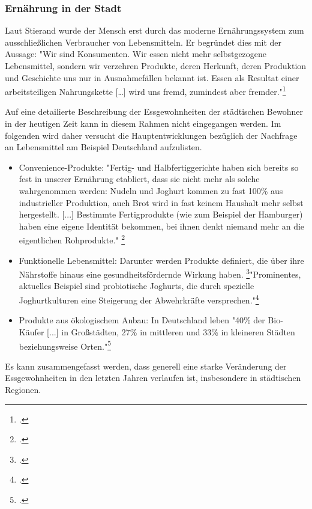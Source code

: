 \documentclass{scrartcl}
\begin{document}
\subsubsection {Ernährung in der Stadt}
  
Laut Stierand wurde der Mensch erst durch das moderne Ernährungssystem zum ausschließlichen Verbraucher von Lebensmitteln. Er begründet dies mit der Aussage: "Wir sind Konsumenten. Wir essen nicht mehr selbstgezogene Lebensmittel, sondern wir verzehren Produkte, deren Herkunft, deren Produktion und Geschichte uns nur in Ausnahmefällen bekannt ist. Essen als Resultat einer arbeitsteiligen Nahrungskette […] wird uns fremd, zumindest aber fremder."\footcite{Spiekermann2000GesundeKulturwissenschaft} 

 Auf eine detailierte Beschreibung der Essgewohnheiten der städtischen Bewohner in der heutigen Zeit kann in diesem Rahmen nicht eingegangen werden. Im folgenden wird daher versucht die Hauptentwicklungen bezüglich der Nachfrage an Lebensmittel am Beispiel Deutschland aufzulisten. 
 
 \begin{itemize}
\item Convenience-Produkte: "Fertig- und Halbfertiggerichte haben sich bereits so fest in unserer Ernährung etabliert, dass sie nicht mehr als solche wahrgenommen werden: Nudeln und Joghurt kommen zu fast 100\% aus industrieller Produktion, auch Brot wird in fast keinem Haushalt mehr selbst hergestellt. [...] Bestimmte Fertigprodukte (wie zum Beispiel der Hamburger)
haben eine eigene Identität bekommen, bei ihnen denkt niemand mehr an die eigentlichen Rohprodukte." \footcite{Escher2003EssenKultur}
\item Funktionelle Lebensmittel: Darunter werden Produkte definiert, die über ihre Nährstoffe hinaus eine gesundheitsfördernde Wirkung haben. \footcites[vgl.][S.5]{Heasman1958-2001TheProfits}"Prominentes, aktuelles Beispiel sind probiotische Joghurts, die durch spezielle Joghurtkulturen eine Steigerung der Abwehrkräfte versprechen."\footcite[S.14]{Stierand2008StadtLebensmittel}
\item Produkte aus ökologischem Anbau: In Deutschland leben "40\% der Bio-Käufer [...] in Großstädten, 27\% in mittleren und 33\% in kleineren Städten beziehungsweise Orten."\footcite[S.14]{Stierand2008StadtLebensmittel}
\end{itemize}
Es kann zusammengefasst werden, dass generell eine starke Veränderung der Essgewohnheiten in den letzten Jahren verlaufen ist, insbesondere in städtischen Regionen.
 
\end{document}
